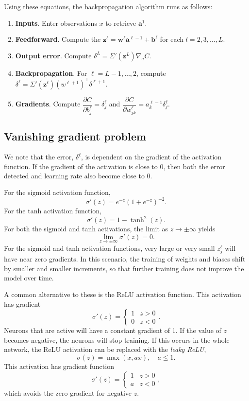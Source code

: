 Using these equations, the backpropagation algorithm runs as follows:
\begin{enumerate}
	\item \textbf{Inputs}. Enter observations $x$ to retrieve $\mathbf{a}^1$.
	\item \textbf{Feedforward}. Compute the $\mathbf{z}^\ell = \mathbf{w}^\ell\mathbf{a}^{\ell-1} + \mathbf{b}^\ell$ for each $l = 2, 3,\ldots,L$.
	\item \textbf{Output error}. Compute $\delta^L = \Sigma'(\mathbf{z}^L)\nabla_aC$.
	\item \textbf{Backpropagation}. For $\ell = L-1, \ldots, 2$, compute $\delta^\ell =  \Sigma'(\mathbf{z}^\ell)(w^{\ell+1})^\intercal\delta^{\ell+1}$.
	\item \textbf{Gradients}. Compute $\dfrac{\partial C}{\partial b_j^\ell} = \delta_j^\ell$ and $\dfrac{\partial C}{\partial w_{jk}^\ell} = a_k^{\ell-1}\delta_j^\ell$.
\end{enumerate}


\subsection*{Vanishing gradient problem}\label{nnet-vanishinggradprob}
We note that the error, $\delta^\ell$, is dependent on the gradient of the activation function. If the gradient of the activation is close to 0, then both the error detected and learning rate also become close to 0.

\noindent For the sigmoid activation function,
\[
	\sigma '(z) = e^{-z}(1+e^{-z})^{-2}.
\]
For the tanh activation function,
\[
	\sigma '(z) = 1-\tanh^2(z).
\]
For both the sigmoid and tanh activations, the limit as $z\rightarrow\pm\infty$ yields 
\[
	\lim_{z\rightarrow\pm\infty}\sigma '(z)= 0.
\]
For the sigmoid and tanh activation functions, very large or very small $z_j^\ell$ will have near zero gradients. In this scenario, the training of weights and biases shift by smaller and smaller increments, so that further training does not improve the model over time.

A common alternative to these is the ReLU activation function. This activation has gradient
\[
	\sigma '(z) = \begin{cases}
		1 & z > 0 \\
		0 & z < 0
	\end{cases}.
\]
Neurons that are active will have a constant gradient of 1. If the value of $z$ becomes negative, the neurons will stop training. If this occurs in the whole network, the ReLU activation can be replaced with the \textit{leaky ReLU},
\[
	\sigma(z) = \max(x, ax), \quad a \le 1.
\]
This activation has gradient function
\[
	\sigma '(z) = \begin{cases}
		1 & z > 0 \\
		a & z < 0
	\end{cases},
\]
which avoids the zero gradient for negative $z$.

